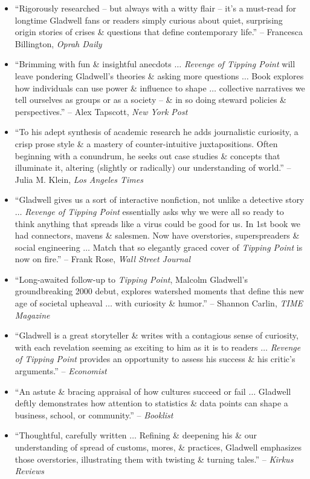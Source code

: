 \documentclass{article}
\begin{document}
\begin{enumerate}
\begin{itemize}
		\item ``Rigorously researched -- but always with a witty flair -- it's a must-read for longtime {\sc Gladwell} fans or readers simply curious about quiet, surprising origin stories of crises \& questions that define contemporary life.'' -- {\sc Francesca Billington}, {\it Oprah Daily}
		\item ``Brimming with fun \& insightful anecdots $\ldots$ {\it Revenge of Tipping Point} will leave pondering {\sc Gladwell}'s theories \& asking more questions $\ldots$ Book explores how individuals can use power \& influence to shape $\ldots$ collective narratives we tell ourselves as groups or as a society -- \& in so doing steward policies \& perspectives.'' -- {\sc Alex Tapscott}, {\it New York Post}
		\item ``To his adept synthesis of academic research he adds journalistic curiosity, a crisp prose style \& a mastery of counter-intuitive juxtapositions. Often beginning with a conundrum, he seeks out case studies \& concepts that illuminate it, altering (slightly or radically) our understanding of world.'' -- {\sc Julia M. Klein}, {\it Los Angeles Times}
		\item ``{\sc Gladwell} gives us a sort of interactive nonfiction, not unlike a detective story $\ldots$ {\it Revenge of Tipping Point} essentially asks why we were all so ready to think anything that spreads like a virus could be good for us. In 1st book we had connectors, mavens \& salesmen. Now have overstories, superspreaders \& social engineering $\ldots$ Match that so elegantly graced cover of {\it Tipping Point} is now on fire.'' -- {\sc Frank Rose}, {\it Wall Street Journal}
		\item ``Long-awaited follow-up to {\it Tipping Point}, {\sc Malcolm Gladwell}'s groundbreaking 2000 debut, explores watershed moments that define this new age of societal upheaval $\ldots$ with curiosity \& humor.'' -- {\sc Shannon Carlin}, {\it TIME Magazine}
		\item ``{\sc Gladwell} is a great storyteller \& writes with a contagious sense of curiosity, with each revelation seeming as exciting to him as it is to readers $\ldots$ {\it Revenge of Tipping Point} provides an opportunity to assess his success \& his critic's arguments.'' -- {\it Economist}
		\item ``An astute \& bracing appraisal of how cultures succeed or fail $\ldots$ {\sc Gladwell} deftly demonstrates how attention to statistics \& data points can shape a business, school, or community.'' -- {\it Booklist}
		\item ``Thoughtful, carefully written $\ldots$ Refining \& deepening his \& our understanding of spread of customs, mores, \& practices, {\sc Gladwell} emphasizes those overstories, illustrating them with twisting \& turning tales.'' -- {\it Kirkus Reviews}
	\end{itemize}


\end{enumerate}
\end{document}

